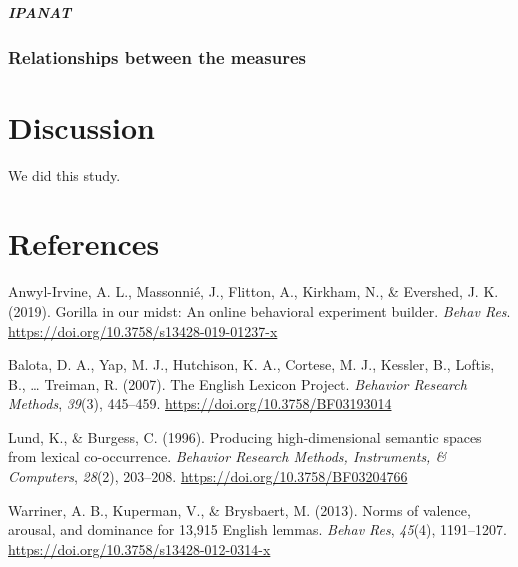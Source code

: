\documentclass[man]{apa6}
\let\oldsubparagraph\subparagraph
\renewcommand{\subparagraph}[1]{\oldsubparagraph{#1}\mbox{}}
\begin{document}
\hypertarget{ipanat-4}{%
\subparagraph{IPANAT}\label{ipanat-4}}

\hypertarget{relationships-between-the-measures}{%
\subsubsection{Relationships between the measures}\label{relationships-between-the-measures}}

\hypertarget{discussion}{%
\section{Discussion}\label{discussion}}

We did this study.

\newpage

\hypertarget{references}{%
\section{References}\label{references}}

\begingroup
\setlength{\parindent}{-0.5in}
\setlength{\leftskip}{0.5in}

\hypertarget{refs}{}
\leavevmode\hypertarget{ref-anwyl-irvine_gorilla_2019}{}%
Anwyl-Irvine, A. L., Massonnié, J., Flitton, A., Kirkham, N., \& Evershed, J. K. (2019). Gorilla in our midst: An online behavioral experiment builder. \emph{Behav Res}. \url{https://doi.org/10.3758/s13428-019-01237-x}

\leavevmode\hypertarget{ref-balota_english_2007}{}%
Balota, D. A., Yap, M. J., Hutchison, K. A., Cortese, M. J., Kessler, B., Loftis, B., \ldots{} Treiman, R. (2007). The English Lexicon Project. \emph{Behavior Research Methods}, \emph{39}(3), 445--459. \url{https://doi.org/10.3758/BF03193014}

\leavevmode\hypertarget{ref-lund_producing_1996}{}%
Lund, K., \& Burgess, C. (1996). Producing high-dimensional semantic spaces from lexical co-occurrence. \emph{Behavior Research Methods, Instruments, \& Computers}, \emph{28}(2), 203--208. \url{https://doi.org/10.3758/BF03204766}

\leavevmode\hypertarget{ref-warriner_norms_2013}{}%
Warriner, A. B., Kuperman, V., \& Brysbaert, M. (2013). Norms of valence, arousal, and dominance for 13,915 English lemmas. \emph{Behav Res}, \emph{45}(4), 1191--1207. \url{https://doi.org/10.3758/s13428-012-0314-x}

\endgroup

\newpage
\end{document}
